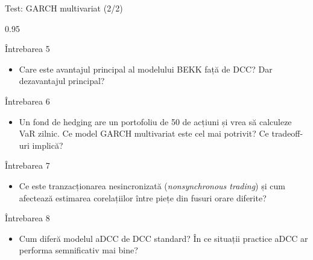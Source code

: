 \documentclass[9pt, aspectratio=169, t]{beamer}
\begin{document}
\begin{frame}{Test: GARCH multivariat (2/2)}
    \begin{cminipage}{0.95\textwidth}
    {\footnotesize
    \begin{block}{Întrebarea 5}
        \begin{itemize}\setlength{\itemsep}{0pt}
            \item Care este avantajul principal al modelului BEKK față de DCC? Dar dezavantajul principal?
        \end{itemize}
    \end{block}
    \begin{block}{Întrebarea 6}
        \begin{itemize}\setlength{\itemsep}{0pt}
            \item Un fond de hedging are un portofoliu de 50 de acțiuni și vrea să calculeze VaR zilnic. Ce model GARCH multivariat este cel mai potrivit? Ce tradeoff-uri implică?
        \end{itemize}
    \end{block}
    \begin{block}{Întrebarea 7}
        \begin{itemize}\setlength{\itemsep}{0pt}
            \item Ce este tranzacționarea nesincronizată (\textit{nonsynchronous trading}) și cum afectează estimarea corelațiilor între piețe din fusuri orare diferite?
        \end{itemize}
    \end{block}
    \begin{block}{Întrebarea 8}
        \begin{itemize}\setlength{\itemsep}{0pt}
            \item Cum diferă modelul aDCC de DCC standard? În ce situații practice aDCC ar performa semnificativ mai bine?
        \end{itemize}
    \end{block}
    }
    \end{cminipage}
\end{frame}
\end{document}
